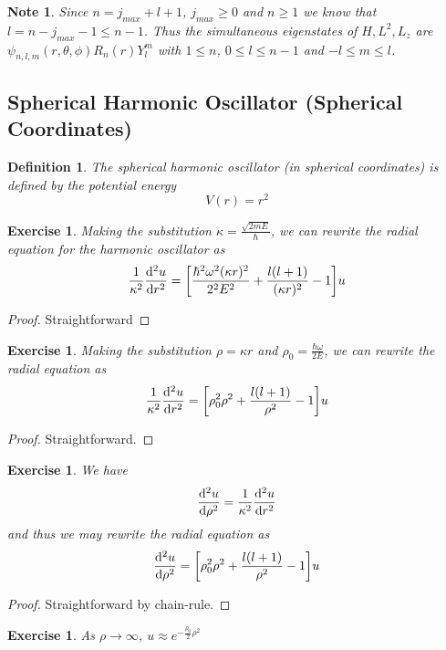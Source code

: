 \documentclass[12pt]{amsart}
\newtheorem{defn}[thm]{Definition}
\newtheorem{note}[thm]{Note}
\newtheorem{ex}[thm]{Exercise}
\newcommand{\om}{\omega}
\newcommand{\kap}{\kappa}
\begin{document}
\begin{note}
Since $n = j_{max} + l + 1$, $j_{max} \geq 0$ and $n \geq 1$ we know that $l = n - j_{max} - 1 \leq n-1$. Thus the simultaneous eigenstates of $H, L^2, L_z$ are $\psi_{n, l, m}(r, \theta, \phi)R_n(r)Y_l^m$ with $1 \leq n$, $0 \leq l \leq n-1$ and $-l \leq m \leq l$. 
\end{note}

\subsection{Spherical Harmonic Oscillator (Spherical Coordinates)}
\begin{defn}
The spherical harmonic oscillator (in spherical coordinates) is defined by the potential energy
$$V(r) = r^2$$
\end{defn}

\begin{ex}
Making the substitution $\kappa = \frac{\sqrt{2mE}}{\hbar}$, we can rewrite the radial equation for the harmonic oscillator as $$\frac{1}{\kap^2}\dv[2]{u}{r} = \bigg[ \frac{\hbar^2 \om^2 (\kap r)^2}{2^2E^2} + \frac{l(l+1)}{(\kap r)^2} - 1\bigg]u$$
\end{ex}

\begin{proof}
Straightforward
\end{proof}

\begin{ex}
Making the substitution $\rho = \kap r$ and $\rho_0 = \frac{\hbar \om}{2 E}$, we can rewrite the radial equation as $$\frac{1}{\kap^2}\dv[2]{u}{r} = \bigg[ \rho_0^2 \rho^2 + \frac{l(l+1)}{\rho^2} - 1\bigg]u$$
\end{ex}

\begin{proof}
Straightforward.
\end{proof}

\begin{ex}
We have $$\dv[2]{u}{\rho} = \frac{1}{\kap^2}\dv[2]{u}{r}$$ and thus we may rewrite the radial equation as $$\dv[2]{u}{\rho} = \bigg[ \rho_0^2 \rho^2 + \frac{l(l+1)}{\rho^2} - 1\bigg]u$$
\end{ex}

\begin{proof}
Straightforward by chain-rule.
\end{proof}

\begin{ex}
As $ \rho \rightarrow \infty$, $u \approx e^{-\frac{\rho_0}{2}\rho^2}$
\end{ex}
\end{document}
